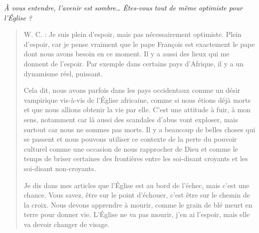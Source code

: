 \textit{
À vous entendre, l’avenir est sombre… Êtes-vous tout de même optimiste pour l’Église ?
}

\begin{quote}
    

W. C. : Je suis plein d’espoir, mais pas nécessairement optimiste. Plein d’espoir, car je pense vraiment que le pape François est exactement le pape dont nous avons besoin en ce moment. Il y a aussi des lieux qui me donnent de l’espoir. Par exemple dans certains pays d’Afrique, il y a un dynamisme réel, puissant.

Cela dit, nous avons parfois dans les pays occidentaux comme un désir vampirique vis-à-vis de l’Église africaine, comme si nous étions déjà morts et que nous allions obtenir la vie par elle. C’est une attitude à fuir, à mon sens, notamment car là aussi des scandales d’abus vont exploser, mais surtout car nous ne sommes pas morts. Il y a beaucoup de belles choses qui se passent et nous pouvons utiliser ce contexte de la perte du pouvoir culturel comme une occasion de nous rapprocher de Dieu et comme le temps de briser certaines des frontières entre les soi-disant croyants et les soi-disant non-croyants.

Je dis dans mes articles que l’Église est au bord de l’échec, mais c’est une chance. Vous savez, être sur le point d’échouer, c’est être sur le chemin de la croix. Nous devons apprendre à mourir, comme le grain de blé meurt en terre pour donner vie. L’Église ne va pas mourir, j’en ai l’espoir, mais elle va devoir changer de visage.
\end{quote}
